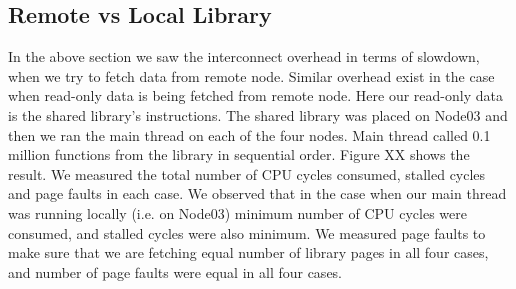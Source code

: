 \subsection{Remote vs Local Library}
In the above section we saw the interconnect overhead in terms of slowdown, when we try to fetch data from remote node.
Similar overhead exist in the case when read-only data is being fetched from remote node.
Here our read-only data is the shared library's instructions.
The shared library was placed on Node03 and then we ran the main thread on each of the four nodes.
Main thread called 0.1 million functions from the library in sequential order.
Figure XX shows the result.
We measured the total number of CPU cycles consumed, stalled cycles and page faults in each case.
We observed that in the case when our main thread was running locally (i.e. on Node03) minimum number of CPU cycles were consumed, and stalled cycles were also minimum.
We measured page faults to make sure that we are fetching equal number of library pages in all four cases, and number of page faults were equal in all four cases.

